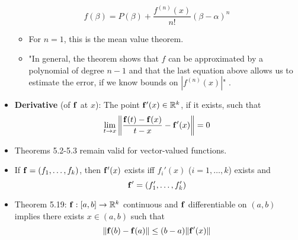 \documentclass[../../notes.tex]{subfiles}
\begin{document}
\begin{itemize}
\begin{equation*}
        f(\beta) = P(\beta)+\frac{f^{(n)}(x)}{n!}(\beta-\alpha)^n
    \end{equation*}
    \begin{itemize}
        \item For $n=1$, this is the mean value theorem.
        \item "In general, the theorem shows that $f$ can be approximated by a polynomial of degree $n-1$ and that the last equation above allows us to estimate the error, if we know bounds on $|f^{(n)}(x)|$" \parencite[111]{bib:Rudin}.
    \end{itemize}
    \item \textbf{Derivative} (of $\mathbf{f}$ at $x$): The point $\mathbf{f}'(x)\in\mathbb{R}^k$, if it exists, such that
    \begin{equation*}
        \lim_{t\to x}\norm{\frac{\mathbf{f}(t)-\mathbf{f}(x)}{t-x}-\mathbf{f}'(x)} = 0
    \end{equation*}
    \item Theorems 5.2-5.3 remain valid for vector-valued functions.
    \item If $\mathbf{f}=(f_1,\dots,f_k)$, then $\mathbf{f}'(x)$ exists iff $f_i'(x)$ ($i=1,\dots,k$) exists and
    \begin{equation*}
        \mathbf{f}' = (f_1',\dots,f_k')
    \end{equation*}
    \item Theorem 5.19: $\mathbf{f}:[a,b]\to\mathbb{R}^k$ continuous and $\mathbf{f}$ differentiable on $(a,b)$ implies there exists $x\in(a,b)$ such that
    \begin{equation*}
        \norm{\mathbf{f}(b)-\mathbf{f}(a)} \leq (b-a)\norm{\mathbf{f}'(x)}
    \end{equation*}
\end{itemize}
\end{document}
